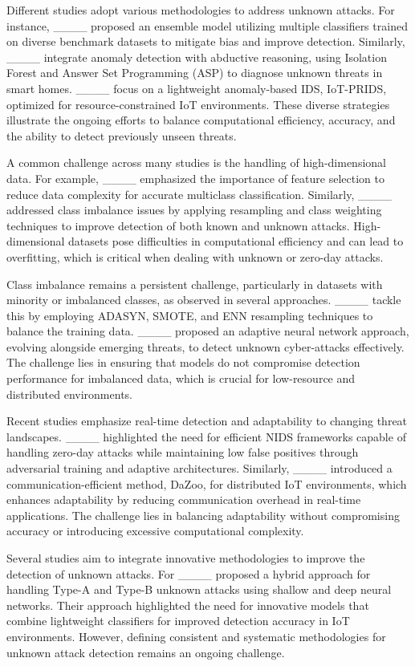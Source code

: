 Different studies adopt various methodologies to address unknown attacks. For instance, ____ proposed an ensemble model utilizing multiple classifiers trained on diverse benchmark datasets to mitigate bias and improve detection. Similarly, ____ integrate anomaly detection with abductive reasoning, using Isolation Forest and Answer Set Programming (ASP) to diagnose unknown threats in smart homes. ____ focus on a lightweight anomaly-based IDS, IoT-PRIDS, optimized for resource-constrained IoT environments. These diverse strategies illustrate the ongoing efforts to balance computational efficiency, accuracy, and the ability to detect previously unseen threats.

A common challenge across many studies is the handling of high-dimensional data. For example, ____ emphasized the importance of feature selection to reduce data complexity for accurate multiclass classification. Similarly, ____ addressed class imbalance issues by applying resampling and class weighting techniques to improve detection of both known and unknown attacks. High-dimensional datasets pose difficulties in computational efficiency and can lead to overfitting, which is critical when dealing with unknown or zero-day attacks.

Class imbalance remains a persistent challenge, particularly in datasets with minority or imbalanced classes, as observed in several approaches. ____ tackle this by employing ADASYN, SMOTE, and ENN resampling techniques to balance the training data. ____ proposed an adaptive neural network approach, evolving alongside emerging threats, to detect unknown cyber-attacks effectively. The challenge lies in ensuring that models do not compromise detection performance for imbalanced data, which is crucial for low-resource and distributed environments.

Recent studies emphasize real-time detection and adaptability to changing threat landscapes. ____ highlighted the need for efficient NIDS frameworks capable of handling zero-day attacks while maintaining low false positives through adversarial training and adaptive architectures. Similarly, ____ introduced a communication-efficient method, DaZoo, for distributed IoT environments, which enhances adaptability by reducing communication overhead in real-time applications. The challenge lies in balancing adaptability without compromising accuracy or introducing excessive computational complexity.

Several studies aim to integrate innovative methodologies to improve the detection of unknown attacks. For ____ proposed a hybrid approach for handling Type-A and Type-B unknown attacks using shallow and deep neural networks. Their approach highlighted the need for innovative models that combine lightweight classifiers for improved detection accuracy in IoT environments. However, defining consistent and systematic methodologies for unknown attack detection remains an ongoing challenge.